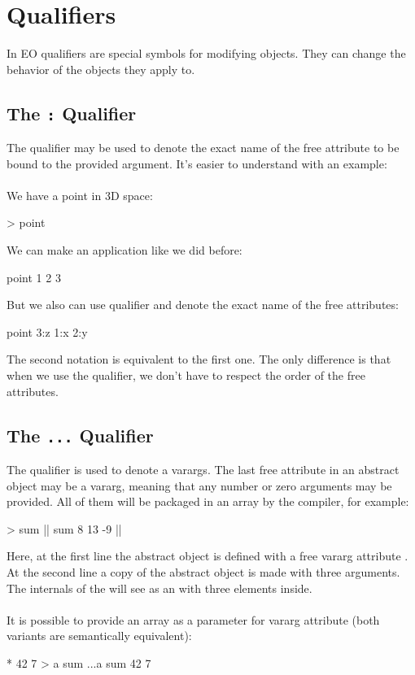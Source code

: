 \documentclass[12pt]{book}
\begin{document}
\section{Qualifiers}
In EO qualifiers are special symbols for modifying objects. They can change the behavior of the objects they apply to.

\subsection{The \texttt{:} Qualifier} \label{subsec:":"-qualifier}
The \ff{:} qualifier may be used to denote the exact name of the free attribute to be bound to the provided argument. It's easier to understand with an example:
\\
\\
We have a point in 3D space:
\begin{ffcode}
[x y z] > point
\end{ffcode}
We can make an application like we did before:
\begin{ffcode}
point
  1
  2
  3
\end{ffcode}
But we also can use \ff{:} qualifier and denote the exact name of the free attributes:
\begin{ffcode}
point
  3:z
  1:x
  2:y
\end{ffcode}
The second notation is equivalent to the first one. The only difference is that when we use the \ff{:} qualifier, we don't have to respect the order of the free attributes.

\subsection{The \texttt{...} Qualifier} \label{subsec:"..."-qualifier}
The  qualifier is used to denote a varargs. The last free attribute in an abstract object may be a vararg, meaning that any number or zero arguments may be provided. All of them will be packaged in an array by the compiler, for example:
\begin{ffcode}
[x...] > sum |$\label{ln:sum-def}$|
sum 8 13 -9 |$\label{ln:sum-instance}$|
\end{ffcode}
Here, at the first line the abstract object  is defined with a free vararg attribute . At the second line a copy of the abstract object is made with three arguments. The internals of the  will see  as an  with three elements inside. 
\\
\\
It is possible to provide an array as a parameter for vararg attribute (both variants are semantically equivalent):
\begin{ffcode}
* 42 7 > a
sum ...a
sum 42 7
\end{ffcode}
\end{document}
